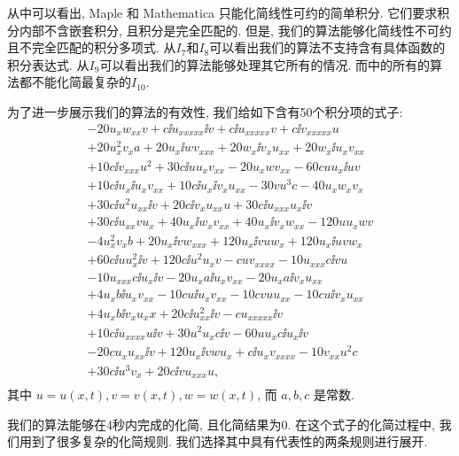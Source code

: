 从中可以看出, Maple 和 Mathematica 只能化简线性可约的简单积分. 它们要求积分内部不含嵌套积分, 且积分是完全匹配的. 但是, 我们的算法能够化简线性不可约且不完全匹配的积分多项式. 从$I_7$和$I_8$可以看出我们的算法不支持含有具体函数的积分表达式. 从$I_9$可以看出我们的算法能够处理其它所有的情况. 而中的所有的算法都不能化简最复杂的$I_{10}$. 

为了进一步展示我们的算法的有效性, 我们给如下含有50个积分项的式子:
\begin{equation}
\renewcommand{\arraystretch}{1.0}
\begin{array}{l}
-20u_xw_{xx}v
+c\ii{u_{xxxxx}\ii{v}}
+c\ii{u_{xxxxx}v}
+c\ii{v_{xxxxx}u}\\%
+20u_x^2v_xa
+20u_x\ii{wv_{xxx}}
+20w_x\ii{v_xu_{xx}}
+20w_x\ii{u_xv_{xx}}\\%
+10c\ii{v_{xxx}u^2}
+30c\ii{uu_xv_{xx}}
-20u_xwv_{xx}
-60cuu_x\ii{uv}\\%
+10c\ii{u_x\ii{u_xv_{xx}}}
+10c\ii{u_x\ii{v_xu_{xx}}}
-30vu^3c
-40u_xw_xv_x\\%
+30c\ii{u^2u_{xx}\ii{v}}
+20c\ii{v_xu_{xx}u}
+30c\ii{u_{xxx}u_x\ii{v}}\\%
+30c\ii{u_{xx}vu_x}
+40u_x\ii{w_xv_{xx}}
+40u_x\ii{v_xw_{xx}}
-120uu_xwv\\%
-4u_x^2v_xb
+20u_x\ii{vw_{xxx}}
+120u_x\ii{vuw_x}
+120u_x\ii{uvw_x}\\%
+60c\ii{uu_x^2\ii{v}}
+120c\ii{u^2u_xv}
-cuv_{xxxx}
-10u_{xxx}c\ii{vu}\\%
-10u_{xxx}c\ii{u_x\ii{v}}
-20u_xa\ii{u_xv_{xx}}
-20u_xa\ii{v_xu_{xx}}\\%
+4u_xb\ii{u_xv_{xx}}
-10cu\ii{u_xv_{xx}}
-10c v u u_{xx}
-10cu\ii{v_xu_{xx}}\\%
+4u_xb\ii{v_xu_xx}
+20c\ii{u_{xx}^2\ii{v}}
-cu_{xxxxx}\ii{v}\\%
+10c\ii{u_{xxxx}u\ii{v}}
+30u^2u_xc\ii{v}
-60uu_xc\ii{u_x\ii{v}}\\%
-20cu_xu_{xx}\ii{v}
+120u_x\ii{vwu_x}
+c\ii{u_xv_{xxxx}}
-10v_{xx}u^2c\\%
+30c\ii{u^3v_x}
+20c\ii{vu_{xxx}u},\\%
\end{array}
\label{big50}
\end{equation}
其中 $u=u(x,t),v=v(x,t),w=w(x,t)$, 而 $a,b,c$ 是常数. 

我们的算法能够在4秒内完成的化简, 且化简结果为0. 在这个式子的化简过程中, 我们用到了很多复杂的化简规则. 我们选择其中具有代表性的两条规则进行展开. 

